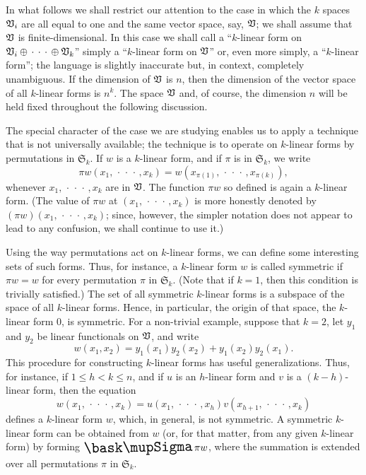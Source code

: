 In what follows we shall restrict our attention to the case in which the \(k\) spaces \(\mathfrak{V}_i\) are all equal to one and the same vector space, say, \(\mathfrak{V}\); we shall assume that \(\mathfrak{V}\) is finite-dimensional. In this case we shall call a ``\(k\)-linear form on \(\mathfrak{V}_i \oplus \,\cdot\,\cdot\,\cdot\, \oplus \mathfrak{V}_k\)'' simply a ``\(k\)-linear form on \(\mathfrak{V}\)'' or, even more simply, a ``\(k\)-linear form''; the language is slightly inaccurate but, in context, completely unambiguous. If the dimension of \(\mathfrak{V}\) is \(n\), then the dimension of the vector space of all \(k\)-linear forms is \(n^k\). The space \(\mathfrak{V}\) and, of course, the dimension \(n\) will be held fixed throughout the following discussion.

The special character of the case we are studying enables us to apply a technique that is not universally available; the technique is to operate on \(k\)-linear forms by permutations in \(\mathfrak{S}_k\). If \(w\) is a \(k\)-linear form, and if \(\pi\) is in \(\mathfrak{S}_k\), we write
\begin{equation*}
    \pi w(x_1, \,\cdot\,\cdot\,\cdot\,, x_k) = w(x_{\pi(1)}, \,\cdot\,\cdot\,\cdot\,, x_{\pi(k)}),
\end{equation*}
whenever \(x_1, \,\cdot\,\cdot\,\cdot\,, x_k\) are in \(\mathfrak{V}\). The function \(\pi w\) so defined is again a \(k\)-linear form. (The value of \(\pi w\) at \((x_1, \,\cdot\,\cdot\,\cdot\,, x_k)\) is more honestly denoted by \((\pi w)(x_1, \,\cdot\,\cdot\,\cdot\,, x_k)\); since, however, the simpler notation does not appear to lead to any confusion, we shall continue to use it.)

Using the way permutations act on \(k\)-linear forms, we can define some interesting sets of such forms. Thus, for instance, a \(k\)-linear form \(w\) is called symmetric if \(\pi w = w\) for every permutation \(\pi\) in \(\mathfrak{S}_k\). (Note that if \(k=1\), then this condition is trivially satisfied.) The set of all symmetric \(k\)-linear forms is a subspace of the space of all \(k\)-linear forms. Hence, in particular, the origin of that space, the \(k\)-linear form \(0\), is symmetric. For a non-trivial example, suppose that \(k=2\), let \(y_1\) and \(y_2\) be linear functionals on \(\mathfrak{V}\), and write
\begin{equation*}
    w(x_1, x_2) = y_1(x_1) y_2(x_2) + y_1(x_2) y_2(x_1).
\end{equation*}
This procedure for constructing \(k\)-linear forms has useful generalizations. Thus, for instance, if \(1 \leq h < k \leq n\), and if \(u\) is an \(h\)-linear form and \(v\) is a \((k-h)\)-linear form, then the equation
\begin{equation*}
    w(x_1, \,\cdot\,\cdot\,\cdot\,, x_k) = u(x_1, \,\cdot\,\cdot\,\cdot\,, x_h) v(x_{h+1}, \,\cdot\,\cdot\,\cdot\,, x_k)
\end{equation*}
defines a \(k\)-linear form \(w\), which, in general, is not symmetric. A symmetric \(k\)-linear form can be obtained from \(w\) (or, for that matter, from any given \(k\)-linear form) by forming \(\sumx \pi w\), where the summation is extended over all permutations \(\pi\) in \(\mathfrak{S}_k\).

